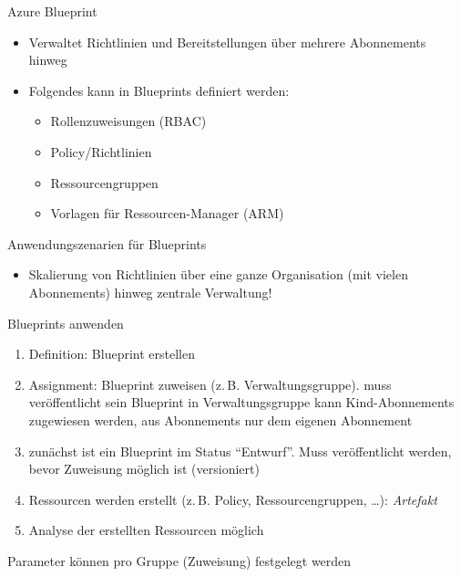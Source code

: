 
\begin{flashcard}[Definition]{Azure Blueprint}
  \begin{itemize}
    \item Verwaltet Richtlinien und Bereitstellungen über mehrere Abonnements hinweg
    \item Folgendes kann in Blueprints definiert werden:
      \begin{itemize}
        \item Rollenzuweisungen (RBAC)
        \item Policy/Richtlinien
        \item Ressourcengruppen
        \item Vorlagen für Ressourcen-Manager (ARM)
      \end{itemize}
  \end{itemize}
\end{flashcard}

\begin{flashcard}[Definition]{Anwendungszenarien für Blueprints}
  \begin{itemize}
    \item Skalierung von Richtlinien über eine ganze Organisation (mit vielen Abonnements) hinweg\newline
      zentrale Verwaltung!
  \end{itemize}
\end{flashcard}

\begin{flashcard}[Definition]{Blueprints anwenden}
  \begin{enumerate}
    \item Definition: Blueprint erstellen
    \item Assignment: Blueprint zuweisen (z.\,B. Verwaltungsgruppe).\newline
      muss veröffentlicht sein
      Blueprint in Verwaltungsgruppe kann Kind-Abonnements zugewiesen werden, aus Abonnements nur dem eigenen Abonnement
    \item[!] zunächst ist ein Blueprint im Status ``Entwurf''. Muss veröffentlicht werden, bevor Zuweisung möglich ist (versioniert)
    \item Ressourcen werden erstellt (z.\,B. Policy, Ressourcengruppen, \ldots): \emph{Artefakt}
    \item Analyse der erstellten Ressourcen möglich
  \end{enumerate}
  Parameter können pro Gruppe (Zuweisung) festgelegt werden
\end{flashcard}

